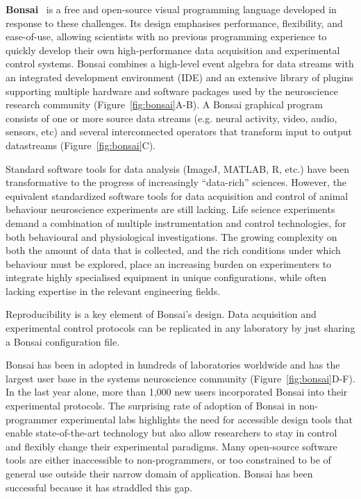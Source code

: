 \textbf{Bonsai}~\citep{lopesEtAl15,lopesAndMonteiro21} is a free and open-source visual programming language developed 
in response to these challenges.
Its design emphasises performance, flexibility, and ease-of-use,
allowing scientists with no previous programming experience to quickly develop
their own high-performance data acquisition and experimental control systems.
Bonsai combines a high-level event algebra for data streams with an integrated
development environment (IDE) and an extensive library of plugins supporting
multiple hardware and software packages used by the neuroscience research
community (Figure~\ref{fig:bonsai}A-B).
%
A Bonsai graphical program consists of one or more source data streams (e.g. neural activity, video, audio, sensors, etc)
and several interconnected operators that transform input to output
datastreams (Figure~\ref{fig:bonsai}C).

Standard software tools for data analysis (ImageJ, MATLAB, R, etc.) have been
transformative to the progress of increasingly “data-rich” sciences. However,
the equivalent standardized software tools for data acquisition and control of
animal behaviour neuroscience experiments are still lacking. Life science experiments demand
a combination of multiple instrumentation and control technologies, for both
behavioural and physiological investigations. The growing complexity on both the
amount of data that is collected, and the rich conditions under which behaviour
must be explored, place an increasing burden on experimenters to integrate
highly specialised equipment in unique configurations, while often lacking
expertise in the relevant engineering fields.

Reproducibility is a key element of Bonsai's design.  Data acquisition and experimental control protocols can be 
replicated in any laboratory by just sharing a Bonsai configuration file. 

Bonsai has been in adopted in hundreds of laboratories worldwide and has the largest user base in the systems neuroscience community (Figure~\ref{fig:bonsai}D-F).  In the last year alone, more than 1,000 new users incorporated Bonsai into their experimental protocols. The surprising rate of adoption of Bonsai in non-programmer experimental
labs highlights the need for accessible design tools that enable
state-of-the-art technology but also allow researchers to stay in control and flexibly
change their experimental paradigms.  Many open-source software tools are
either inaccessible to non-programmers, or too constrained to be of general use
outside their narrow domain of application. Bonsai has been successful because
it has straddled this gap.

